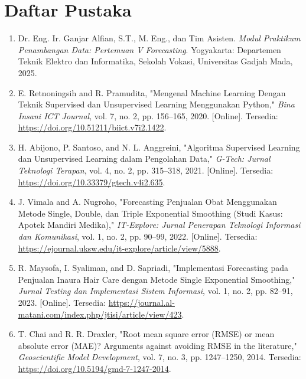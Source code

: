 \documentclass[a4paper,oneside,11pt]{book}
\begin{document}
\chapter{Daftar Pustaka}
\begin{enumerate}
    \item \label{modulPraktikum} Dr. Eng. Ir. Ganjar Alfian, S.T., M. Eng., dan Tim Asisten. \textit{Modul Praktikum Penambangan Data: Pertemuan V Forecasting}. Yogyakarta: Departemen Teknik Elektro dan Informatika, Sekolah Vokasi, Universitas Gadjah Mada, 2025.
    
    \item \label{retnoningsih} E. Retnoningsih and R. Pramudita, "Mengenal Machine Learning Dengan Teknik Supervised dan Unsupervised Learning Menggunakan Python," \textit{Bina Insani ICT Journal}, vol. 7, no. 2, pp. 156--165, 2020. [Online]. Tersedia: \url{https://doi.org/10.51211/biict.v7i2.1422}.
    
    \item \label{santoso} H. Abijono, P. Santoso, and N. L. Anggreini, "Algoritma Supervised Learning dan Unsupervised Learning dalam Pengolahan Data," \textit{G-Tech: Jurnal Teknologi Terapan}, vol. 4, no. 2, pp. 315--318, 2021. [Online]. Tersedia: \url{https://doi.org/10.33379/gtech.v4i2.635}.
    
    \item \label{vimala} J. Vimala and A. Nugroho, "Forecasting Penjualan Obat Menggunakan Metode Single, Double, dan Triple Exponential Smoothing (Studi Kasus: Apotek Mandiri Medika)," \textit{IT-Explore: Jurnal Penerapan Teknologi Informasi dan Komunikasi}, vol. 1, no. 2, pp. 90--99, 2022. [Online]. Tersedia: \url{https://ejournal.uksw.edu/it-explore/article/view/5888}.
    
    \item \label{maysofa} R. Maysofa, I. Syaliman, and D. Sapriadi, "Implementasi Forecasting pada Penjualan Inaura Hair Care dengan Metode Single Exponential Smoothing," \textit{Jurnal Testing dan Implementasi Sistem Informasi}, vol. 1, no. 2, pp. 82--91, 2023. [Online]. Tersedia: \url{https://journal.al-matani.com/index.php/jtisi/article/view/423}.
    
    \item \label{chai} T. Chai and R. R. Draxler, "Root mean square error (RMSE) or mean absolute error (MAE)? Arguments against avoiding RMSE in the literature," \textit{Geoscientific Model Development}, vol. 7, no. 3, pp. 1247--1250, 2014. Tersedia: \url{https://doi.org/10.5194/gmd-7-1247-2014}.
    

\end{enumerate}
\end{document}
